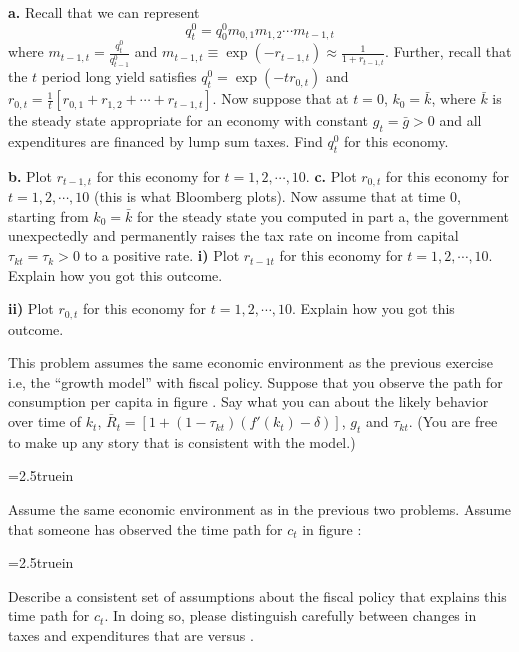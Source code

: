 \medskip

 \noindent
{\bf a.} Recall that we can represent
$$ q_t^0  = q_0^0m_{0,1}m_{1,2}\cdots m_{t-1,t} $$
where $m_{t-1,t}  = {\frac{q_t^0}{q_{t-1}^0}} $ and $ m_{t-1,t} \equiv \exp(-r_{t-1,t})\approx {\frac{1}{1+r_{t-1,t}}}$.
Further, recall that the $t$ period long yield  satisfies
$q_t^0  =\exp(-tr_{0,t}) $
and $
r_{0,t}  = {\frac{1}{t}}[r_{0,1}+r_{1,2}+\cdots+r_{t-1,t}] $.
Now suppose that at $t=0$, $k_0=\bar k$, where $\bar k$ is the steady state appropriate for an economy with constant $g_t=\bar g >0$ and all expenditures are financed by lump sum taxes. Find $q_t^0$ for this economy.

\medskip \noindent
{\bf b.} Plot $r_{t-1,t}$ for this economy for $t=1,2,\cdots,10$.
\medskip \noindent
{\bf c.} Plot $r_{0,t}$ for this economy for $t=1,2,\cdots,10$ (this is what Bloomberg plots).
\medskip
{} Now assume that at time 0, starting from $k_0=\bar k$ for the steady state you computed in part a, the government unexpectedly and permanently raises the tax rate on income from capital $\tau_{kt}=\tau_k >0$ to a positive rate.
\medskip \indent
{\bf i)} Plot $r_{t-1t}$ for this economy for $t=1,2,\cdots,10$. Explain how you got this outcome.

\medskip \indent
{\bf ii)} Plot $r_{0,t}$ for this economy for $t=1,2,\cdots,10$. Explain how you got this outcome.



\medskip
{}
\medskip
\noindent
 This problem assumes the same economic environment as the previous exercise i.e, the ``growth model'' with fiscal policy.
Suppose that you observe the path for consumption per capita in figure . Say what you can about the likely behavior over time of $k_t$, $\bar R_t =[1 + (1-\tau_{kt})(f'(k_t)-\delta)]$, $g_t$ and $\tau_{kt}$. (You are free to make up any story that is consistent with the model.)

\medskip


\centerline{\epsfxsize=2.5truein}
\caption{Consumption per capita.}
\endfigure




\medskip
{}
\medskip
\noindent Assume the same economic environment as in the previous two problems. Assume that someone has observed the  time path for $c_t$ in figure :
\medskip
{}
\centerline{\epsfxsize=2.5truein}
\caption{Consumption per capita.}
\endfigure
\medskip
{} Describe a consistent set of assumptions about the fiscal policy that explains this time path for
$c_t$. In doing so, please distinguish carefully between changes in taxes and expenditures that are  versus .

